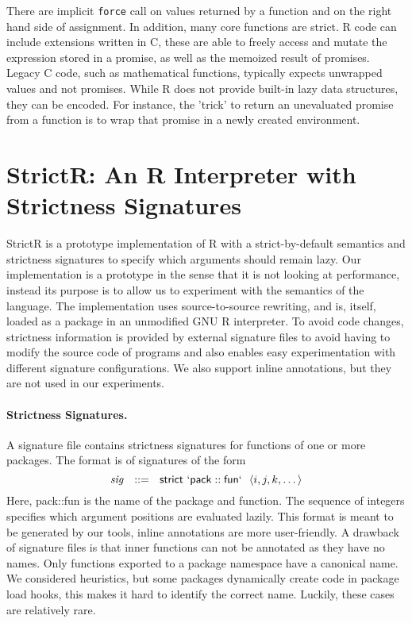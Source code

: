 \documentclass[review,creen,acmsmall]{acmart}
\renewcommand{\c}[1]{\lstinline |#1|\xspace}
\newcommand{\strictr}{{\sf StrictR}\xspace}
\begin{document}
There are implicit \c{force} call on values returned by a function and on the
right hand side of assignment. In addition, many core functions are strict. R
code can include extensions written in C, these are able to freely access and
mutate the expression stored in a promise, as well as the memoized result of
promises. Legacy C code, such as mathematical functions, typically expects
unwrapped values and not promises. While R does not provide built-in lazy data
structures, they can be encoded. For instance, the 'trick' to return an
unevaluated promise from a function is to wrap that promise in a newly created
environment.

\section{StrictR: An R Interpreter with Strictness Signatures}\label{sec:strictr}

\strictr is a prototype implementation of R with a strict-by-default semantics
and strictness signatures to specify which arguments should remain lazy. Our
implementation is a prototype in the sense that it is not looking at
performance, instead its purpose is to allow us to experiment with the semantics
of the language. The implementation uses source-to-source rewriting, and is,
itself, loaded as a package in an unmodified GNU R interpreter. To avoid code
changes, strictness information is provided by external signature files
to avoid having to modify the source code
of programs and also enables easy experimentation with different signature
configurations. We also support inline annotations, but they are not used in our
experiments.


\paragraph{Strictness Signatures.}
A signature file contains strictness signatures for functions of one or more
packages. The format is of signatures of the form
%
\[
\mathit{sig}~~::=~~\mathsf{strict}~\mathsf{`pack}::\mathsf{fun`}~~\langle i, j, k, \dots\rangle
\]
%
Here, {\sf pack::fun} is the name of the package and function. The sequence of
integers specifies which argument positions are evaluated lazily. This format is
meant to be generated by our tools, inline annotations are more user-friendly. A
drawback of signature files is that inner functions can not be annotated as they
have no names. Only functions exported to a package namespace have a canonical
name. We considered heuristics, but some packages dynamically create code in
package load hooks, this makes it hard to identify the correct name. Luckily,
these cases are relatively rare.
\end{document}
